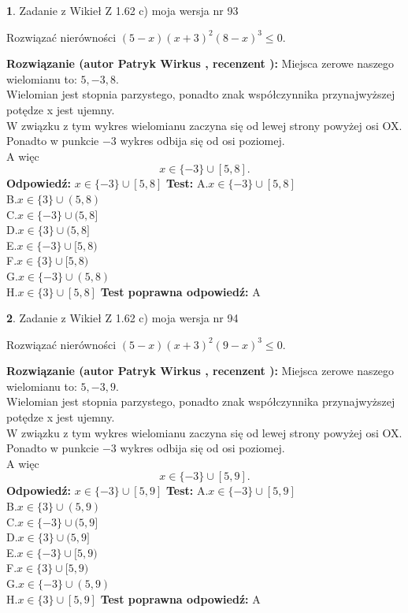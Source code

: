 \documentclass[12pt, a4paper]{article}
\theoremstyle{definition} %
\newtheorem{zad}{}
\newcommand{\zadStart}[1]{\begin{zad}#1\newline}
\newcommand{\zadStop}{\end{zad}}
\newcommand{\rozwStart}[2]{\noindent \textbf{Rozwiązanie (autor #1 , recenzent #2): }\newline}
\newcommand{\rozwStop}{\newline}
\newcommand{\odpStart}{\noindent \textbf{Odpowiedź:}\newline}
\newcommand{\odpStop}{\newline}
\newcommand{\testStart}{\noindent \textbf{Test:}\newline}
\newcommand{\testStop}{\newline}
\newcommand{\kluczStart}{\noindent \textbf{Test poprawna odpowiedź:}\newline}
\newcommand{\kluczStop}{\newline}
\begin{document}
\zadStart{Zadanie z Wikieł Z 1.62 c) moja wersja nr 93}

Rozwiązać nierówności $(5-x)(x+3)^{2}(8-x)^{3}\le0$.
\zadStop
\rozwStart{Patryk Wirkus}{}
Miejsca zerowe naszego wielomianu to: $5, -3, 8$.\\
Wielomian jest stopnia parzystego, ponadto znak współczynnika przy\linebreak najwyższej potędze x jest ujemny.\\ W związku z tym wykres wielomianu zaczyna się od lewej strony powyżej osi OX.\\
Ponadto w punkcie $-3$ wykres odbija się od osi poziomej.\\
A więc $$x \in \{-3\} \cup [5,8].$$
\rozwStop
\odpStart
$x \in \{-3\} \cup [5,8]$
\odpStop
\testStart
A.$x \in \{-3\} \cup [5,8]$\\
B.$x \in \{3\} \cup (5,8)$\\
C.$x \in \{-3\} \cup (5,8]$\\
D.$x \in \{3\} \cup (5,8]$\\
E.$x \in \{-3\} \cup [5,8)$\\
F.$x \in \{3\} \cup [5,8)$\\
G.$x \in \{-3\} \cup (5,8)$\\
H.$x \in \{3\} \cup [5,8]$
\testStop
\kluczStart
A
\kluczStop



\zadStart{Zadanie z Wikieł Z 1.62 c) moja wersja nr 94}

Rozwiązać nierówności $(5-x)(x+3)^{2}(9-x)^{3}\le0$.
\zadStop
\rozwStart{Patryk Wirkus}{}
Miejsca zerowe naszego wielomianu to: $5, -3, 9$.\\
Wielomian jest stopnia parzystego, ponadto znak współczynnika przy\linebreak najwyższej potędze x jest ujemny.\\ W związku z tym wykres wielomianu zaczyna się od lewej strony powyżej osi OX.\\
Ponadto w punkcie $-3$ wykres odbija się od osi poziomej.\\
A więc $$x \in \{-3\} \cup [5,9].$$
\rozwStop
\odpStart
$x \in \{-3\} \cup [5,9]$
\odpStop
\testStart
A.$x \in \{-3\} \cup [5,9]$\\
B.$x \in \{3\} \cup (5,9)$\\
C.$x \in \{-3\} \cup (5,9]$\\
D.$x \in \{3\} \cup (5,9]$\\
E.$x \in \{-3\} \cup [5,9)$\\
F.$x \in \{3\} \cup [5,9)$\\
G.$x \in \{-3\} \cup (5,9)$\\
H.$x \in \{3\} \cup [5,9]$
\testStop
\kluczStart
A
\kluczStop
\end{document}
